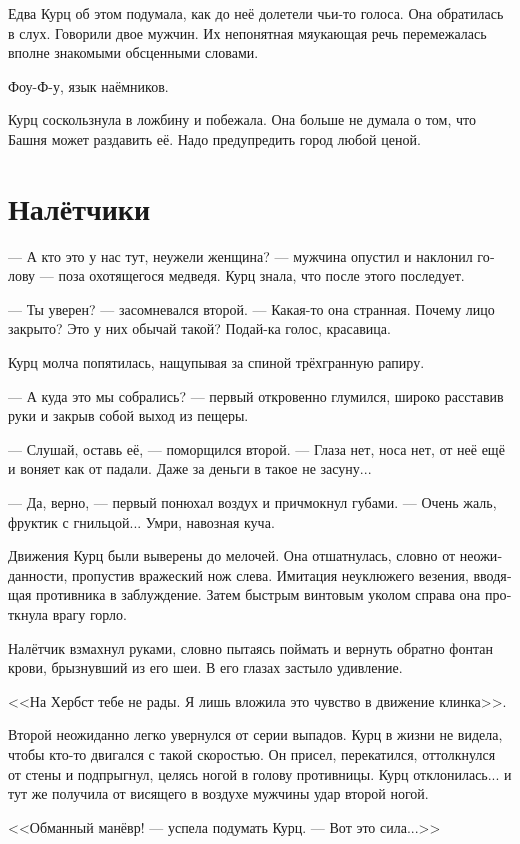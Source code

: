\documentclass[a4paper,12pt,fleqn]{book}\usepackage{polyglossia}\setdefaultlanguage[babelshorthands=true]{russian}\setotherlanguage{english}\defaultfontfeatures{Ligatures=TeX,Mapping=tex-text}\usepackage{xcolor}\newcommand{\ml}[3]{#2}
\begin{document}
Едва Курц об этом подумала, как до неё долетели чьи-то голоса.
Она обратилась в слух.
Говорили двое мужчин.
Их непонятная мяукающая речь перемежалась вполне знакомыми обсценными словами.

Фоу-Ф-у, язык наёмников.

Курц соскользнула в ложбину и побежала.
Она больше не думала о том, что Башня может раздавить её.
Надо предупредить город любой ценой.

\section{Налётчики}

--- А кто это у нас тут, неужели женщина? --- мужчина опустил и наклонил голову --- поза охотящегося медведя.
Курц знала, что после этого последует.

--- Ты уверен? --- засомневался второй.
--- Какая-то она странная.
Почему лицо закрыто?
Это у них обычай такой?
Подай-ка голос, красавица.

Курц молча попятилась, нащупывая за спиной трёхгранную рапиру.

--- А куда это мы собрались? --- первый откровенно глумился, широко расставив руки и закрыв собой выход из пещеры.

--- Слушай, оставь её, --- поморщился второй.
--- Глаза нет, носа нет, от неё ещё и воняет как от падали.
Даже за деньги в такое не засуну...

--- Да, верно, --- первый понюхал воздух и причмокнул губами.
--- Очень жаль, фруктик с гнильцой...
Умри, навозная куча.

Движения Курц были выверены до мелочей.
Она отшатнулась, словно от неожиданности, пропустив вражеский нож слева.
Имитация неуклюжего везения, вводящая противника в заблуждение.
Затем быстрым винтовым уколом справа она проткнула врагу горло.

Налётчик взмахнул руками, словно пытаясь поймать и вернуть обратно фонтан крови, брызнувший из его шеи.
В его глазах застыло удивление.

<<На Хербст тебе не рады.
Я лишь вложила это чувство в движение клинка>>.

Второй неожиданно легко увернулся от серии выпадов.
Курц в жизни не видела, чтобы кто-то двигался с такой скоростью.
Он присел, перекатился, оттолкнулся от стены и подпрыгнул, целясь ногой в голову противницы.
Курц отклонилась... и тут же получила от висящего в воздухе мужчины удар второй ногой.

<<Обманный манёвр! --- успела подумать Курц.
--- Вот это сила...>>
\end{document}

